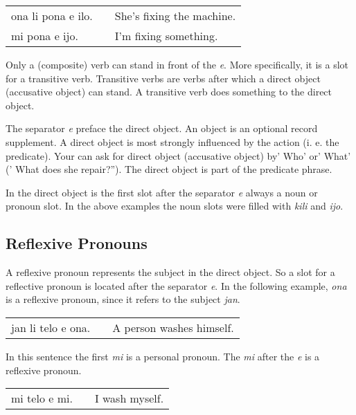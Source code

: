 \begin{supertabular}{p{5,5cm}|ll}
    ona li pona e ilo. &  & She's fixing the machine. \\
    mi pona e ijo.     &  & I'm fixing something.     \\
\end{supertabular}

Only a (composite) verb can stand in front of the \textit{e}.
More specifically, it is a slot for a transitive verb.
Transitive verbs are verbs after which a direct object (accusative object) can stand.
A transitive verb does something to the direct object.

The separator \textit{e} preface the direct object.
An object is an optional record supplement.
A direct object is most strongly influenced by the action (i. e. the predicate).
Your can ask for direct object (accusative object) by' Who' or' What' (' What does she repair?'').
The direct object is part of the predicate phrase.

In the direct object is the first slot after the separator \textit{e} always a noun or pronoun slot.
In the above examples the noun slots were filled with \textit{kili} and \textit{ijo}.

%
\subsection*{Reflexive Pronouns}
%

A reflexive pronoun represents the subject in the direct object.
So a slot for a reflective pronoun is located after the separator \textit{e}.
In the following example, \textit{ona} is a reflexive pronoun, since it refers to the subject \textit{jan}.

\begin{supertabular}{p{5,5cm}|ll}
    jan li telo e ona. &  & A person washes himself. \\
\end{supertabular}

In this sentence the first \textit{mi} is a personal pronoun.
The \textit{mi} after the \textit{e} is a reflexive pronoun.

\begin{supertabular}{p{5,5cm}|ll}
    mi telo e mi. &  & I wash myself. \\
\end{supertabular}

